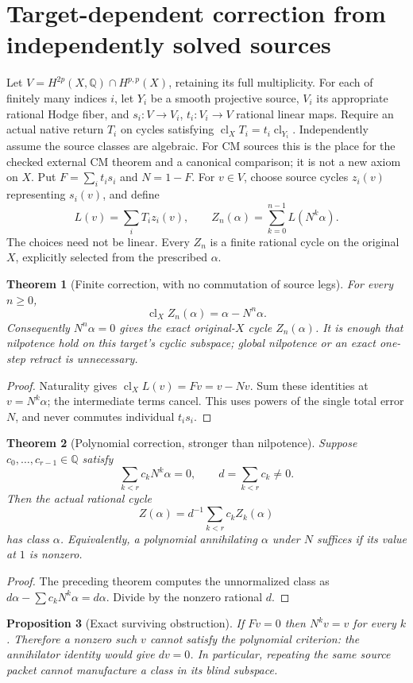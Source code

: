 \documentclass[11pt]{article}
\newtheorem{theorem}{Theorem}
\newtheorem{proposition}[theorem]{Proposition}
\newcommand{\Q}{\mathbb Q}
\newcommand{\cl}{\operatorname{cl}}
\begin{document}
\section{Target-dependent correction from independently solved sources}
Let $V=H^{2p}(X,\Q)\cap H^{p,p}(X)$, retaining its full multiplicity.
For each of finitely many indices $i$, let $Y_i$ be a smooth projective
source, $V_i$ its appropriate rational Hodge fiber, and
$s_i:V\to V_i$, $t_i:V_i\to V$ rational linear maps.
Require an actual native return $T_i$ on cycles satisfying
$\cl_X T_i=t_i\cl_{Y_i}$. Independently assume the source classes are
algebraic. For CM sources this is the place for the checked external CM
theorem and a canonical comparison; it is not a new axiom on $X$.
Put $F=\sum_i t_i s_i$ and $N=1-F$. For $v\in V$, choose source cycles
$z_i(v)$ representing $s_i(v)$, and define
\[
 L(v)=\sum_i T_i z_i(v),\qquad
 Z_n(\alpha)=\sum_{k=0}^{n-1}L(N^k\alpha).
\]
The choices need not be linear. Every $Z_n$ is a finite rational cycle on
the original $X$, explicitly selected from the prescribed $\alpha$.
\begin{theorem}[Finite correction, with no commutation of source legs]
For every $n\ge0$,
\[
 \cl_X Z_n(\alpha)=\alpha-N^n\alpha.
\]
Consequently $N^n\alpha=0$ gives the exact original-$X$ cycle
$Z_n(\alpha)$. It is enough that nilpotence hold on this target's cyclic
subspace; global nilpotence or an exact one-step retract is unnecessary.
\end{theorem}
\begin{proof}
Naturality gives $\cl_X L(v)=Fv=v-Nv$. Sum these identities at
$v=N^k\alpha$; the intermediate terms cancel. This uses powers of the
single total error $N$, and never commutes individual $t_is_i$.
\end{proof}
\begin{theorem}[Polynomial correction, stronger than nilpotence]
Suppose $c_0,\ldots,c_{r-1}\in\Q$ satisfy
\[
 \sum_{k<r}c_kN^k\alpha=0,\qquad d=\sum_{k<r}c_k\ne0.
\]
Then the actual rational cycle
\[
 Z(\alpha)=d^{-1}\sum_{k<r}c_kZ_k(\alpha)
\]
has class $\alpha$. Equivalently, a polynomial annihilating $\alpha$
under $N$ suffices if its value at $1$ is nonzero.
\end{theorem}
\begin{proof}
The preceding theorem computes the unnormalized class as
$d\alpha-\sum c_kN^k\alpha=d\alpha$. Divide by the nonzero rational $d$.
\end{proof}
\begin{proposition}[Exact surviving obstruction]
If $Fv=0$ then $N^kv=v$ for every $k$. Therefore a nonzero such $v$
cannot satisfy the polynomial criterion: the annihilator identity would
give $dv=0$. In particular, repeating the same source packet cannot
manufacture a class in its blind subspace.
\end{proposition}
\end{document}
